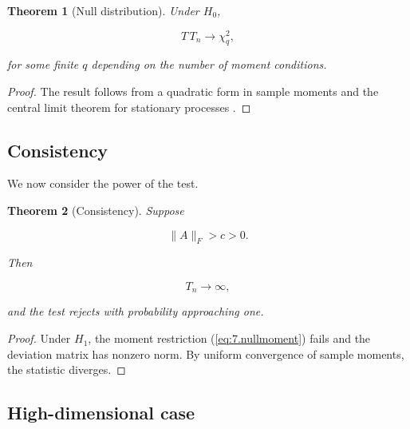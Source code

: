 \documentclass[12pt]{article}
\numberwithin{equation}{section}
\newtheorem{theorem}{Theorem}[section]
\begin{document}
\begin{theorem}[Null distribution]

Under $H_0$,

\begin{equation}
T
\,
T_n
\to
\chi^2_q,
\label{eq:7.chi}
\end{equation}

for some finite $q$ depending on the number of moment conditions.

\end{theorem}

\begin{proof}

The result follows from a quadratic form in sample moments and the
central limit theorem for stationary processes
\citep{newey1994large}.

\end{proof}

\subsection{Consistency}

We now consider the power of the test.

\begin{theorem}[Consistency]

Suppose

\begin{equation}
\|A\|_F > c > 0.
\label{eq:7.alt}
\end{equation}

Then

\begin{equation}
T_n
\to
\infty,
\label{eq:7.consistency}
\end{equation}

and the test rejects with probability approaching one.

\end{theorem}

\begin{proof}

Under $H_1$, the moment restriction
(\ref{eq:7.nullmoment}) fails and the deviation matrix
has nonzero norm. By uniform convergence of sample moments,
the statistic diverges.

\end{proof}

\subsection{High-dimensional case}
\end{document}

